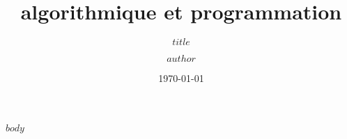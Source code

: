 \documentclass[10pt,aspectratio=149]{beamer}
\author{$author$}
\title{algorithmique et programmation}
\subtitle{$title$}
\date{\today}
\institute{Universit\'e du Qu\'ebec \`a Rimouski}
\begin{document}
\begin{frame}[plain]
   \titlepage
\end{frame}

$body$
\end{document}
